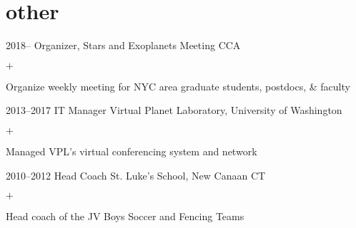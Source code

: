 \documentclass[]{luger-cv} %
\begin{document}
    \section{other}
    \begin{entrylist}


        \entry
        {2018--}
        {Organizer, Stars and Exoplanets Meeting}
        {CCA}
        {%
            \vspace{-1em}
            \begin{list}{$+$}{\cvlist}
                \item Organize weekly meeting for NYC area graduate students, postdocs, \& faculty
            \end{list}
        }


        \entry
        {2013--2017}
        {IT Manager}
        {Virtual Planet Laboratory, University of Washington}
        {%
            \vspace{-1em}
            \begin{list}{$+$}{\cvlist}
                \item Managed VPL's virtual conferencing system and network
            \end{list}
        }


        \entry
        {2010--2012}
        {Head Coach}
        {St. Luke's School, New Canaan CT}
        {%
            \vspace{-1em}
            \begin{list}{$+$}{\cvlist}
                \item Head coach of the JV Boys Soccer and Fencing Teams
            \end{list}
        }


    \end{entrylist}
\fi

\end{document}
